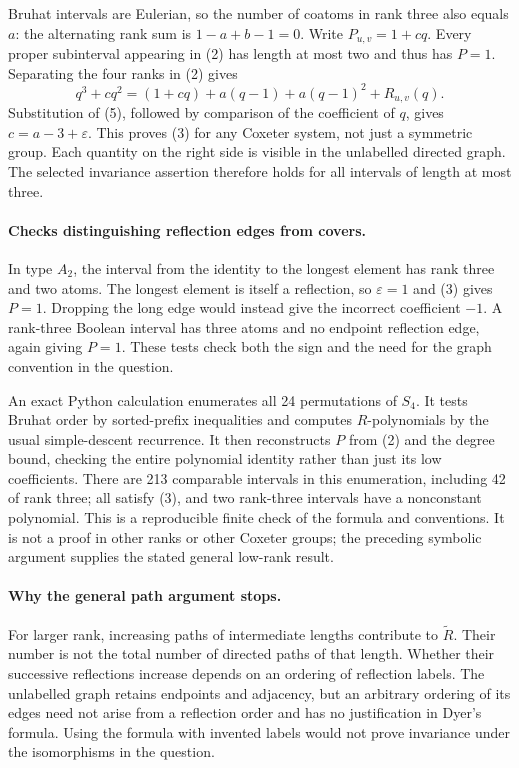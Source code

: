 \documentclass[11pt]{article}
\begin{document}
Bruhat intervals are Eulerian, so the number of coatoms in rank three
also equals $a$: the alternating rank sum is $1-a+b-1=0$.
Write $P_{u,v}=1+cq$. Every proper subinterval appearing in (2) has
length at most two and thus has $P=1$. Separating the four ranks in
(2) gives
\[
 q^3+cq^2=(1+cq)+a(q-1)+a(q-1)^2+R_{u,v}(q).
\]
Substitution of (5), followed by comparison of the coefficient of $q$,
gives $c=a-3+\varepsilon$. This proves (3) for any Coxeter system,
not just a symmetric group. Each quantity on the right side is visible
in the unlabelled directed graph. The selected invariance assertion
therefore holds for all intervals of length at most three.

\paragraph{Checks distinguishing reflection edges from covers.}
In type $A_2$, the interval from the identity to the longest element
has rank three and two atoms. The longest element is itself a
reflection, so $\varepsilon=1$ and (3) gives $P=1$. Dropping the
long edge would instead give the incorrect coefficient $-1$.
A rank-three Boolean interval has three atoms and no endpoint
reflection edge, again giving $P=1$. These tests check both the sign
and the need for the graph convention in the question.

An exact Python calculation enumerates all 24 permutations of $S_4$.
It tests Bruhat order by sorted-prefix inequalities and computes
$R$-polynomials by the usual simple-descent recurrence. It then
reconstructs $P$ from (2) and the degree bound, checking the entire
polynomial identity rather than just its low coefficients. There are
213 comparable intervals in this enumeration, including 42 of rank
three; all satisfy (3), and two rank-three intervals have a nonconstant
polynomial. This is a reproducible finite check of the formula and
conventions. It is not a proof in other ranks or other Coxeter groups;
the preceding symbolic argument supplies the stated general low-rank
result.

\paragraph{Why the general path argument stops.}
For larger rank, increasing paths of intermediate lengths contribute
to $\widetilde R$. Their number is not the total number of directed
paths of that length. Whether their successive reflections increase
depends on an ordering of reflection labels. The unlabelled graph
retains endpoints and adjacency, but an arbitrary ordering of its
edges need not arise from a reflection order and has no justification
in Dyer's formula. Using the formula with invented labels would not
prove invariance under the isomorphisms in the question.
\end{document}
